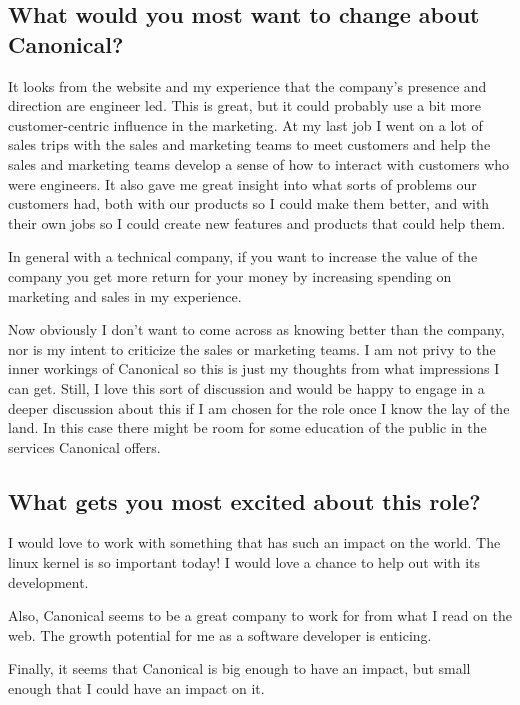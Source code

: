 \documentclass[letter,12pt]{article}
\begin{document}
\subsection{What would you most want to change about Canonical?}
It looks from the website and my experience that the company's presence and direction are engineer led. This is great, but it could probably use a bit more customer-centric influence in the marketing. At my last job I went on a lot of sales trips with the sales and marketing teams to meet customers and help the sales and marketing teams develop a sense of how to interact with customers who were engineers. It also gave me great insight into what sorts of problems our customers had, both with our products so I could make them better, and with their own jobs so I could create new features and products that could help them.

In general with a technical company, if you want to increase the value of the company you get more return for your money by increasing spending on marketing and sales in my experience.

Now obviously I don't want to come across as knowing better than the company, nor is my intent to criticize the sales or marketing teams. I am not privy to the inner workings of Canonical so this is just my thoughts from what impressions I can get. Still, I love this sort of discussion and would be happy to engage in a deeper discussion about this if I am chosen for the role once I know the lay of the land. In this case there might be room for some education of the public in the services Canonical offers.

\subsection{What gets you most excited about this role?}
I would love to work with something that has such an impact on the world. The linux kernel is so important today! I would love a chance to help out with its development.

Also, Canonical seems to be a great company to work for from what I read on the web. The growth potential for me as a software developer is enticing.

Finally, it seems that Canonical is big enough to have an impact, but small enough that I could have an impact on it.
\end{document}
